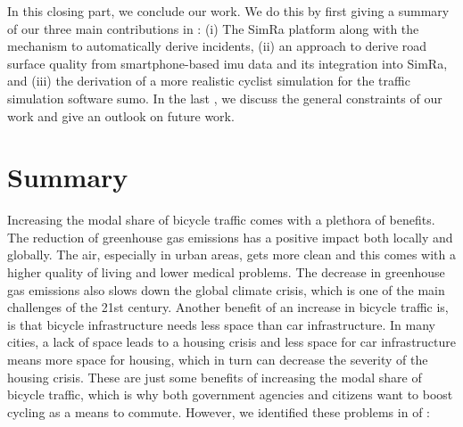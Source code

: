 \vspace*{\fill}
In this closing part, we conclude our work.
We do this by first giving a summary of our three main contributions in : (i) The SimRa platform along with the mechanism to automatically derive incidents, (ii) an approach to derive road surface quality from smartphone-based \ac{imu} data and its integration into SimRa, and (iii) the derivation of a more realistic cyclist simulation for the traffic simulation software \ac{sumo}.
In the last , we discuss the general constraints of our work and give an outlook on future work.
\vspace*{\fill}
\chapter{Summary}
\label{cha:summary}
Increasing the modal share of bicycle traffic comes with a plethora of benefits.
The reduction of greenhouse gas emissions has a positive impact both locally and globally.
The air, especially in urban areas, gets more clean and this comes with a higher quality of living and lower medical problems.
The decrease in greenhouse gas emissions also slows down the global climate crisis, which is one of the main challenges of the 21st century.
Another benefit of an increase in bicycle traffic is, is that bicycle infrastructure needs less space than car infrastructure.
In many cities, a lack of space leads to a housing crisis and less space for car infrastructure means more space for housing, which in turn can decrease the severity of the housing crisis.
These are just some benefits of increasing the modal share of bicycle traffic, which is why both government agencies and citizens want to boost cycling as a means to commute.
However, we identified these problems in  of :

